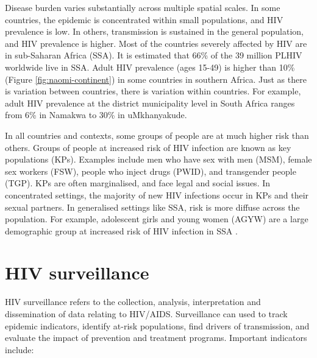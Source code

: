 \documentclass[a4paper, nobind]{templates/ociamthesis}
\begin{document}
Disease burden varies substantially across multiple spatial scales.
In some countries, the epidemic is concentrated within small populations, and HIV prevalence is low.
In others, transmission is sustained in the general population, and HIV prevalence is higher.
Most of the countries severely affected by HIV are in sub-Saharan Africa (SSA).
It is estimated that 66\% of the 39 million PLHIV worldwide live in SSA.
Adult HIV prevalence (ages 15-49) is higher than 10\% (Figure \ref{fig:naomi-continent}) in some countries in southern Africa.
Just as there is variation between countries, there is variation within countries.
For example, adult HIV prevalence at the district municipality level in South Africa ranges from 6\% in Namakwa to 30\% in uMkhanyakude.

In all countries and contexts, some groups of people are at much higher risk than others.
Groups of people at increased risk of HIV infection are known as key populations (KPs).
Examples include men who have sex with men (MSM), female sex workers (FSW), people who inject drugs (PWID), and transgender people (TGP).
KPs are often marginalised, and face legal and social issues.
In concentrated settings, the majority of new HIV infections occur in KPs and their sexual partners.
In generalised settings like SSA, risk is more diffuse across the population.
For example, adolescent girls and young women (AGYW) are a large demographic group at increased risk of HIV infection in SSA \autocite{risher2021age,monod2023growing}.

\hypertarget{hiv-surveillance}{%
\section{\texorpdfstring{HIV surveillance \label{sec:surveillance}}{HIV surveillance }}\label{hiv-surveillance}}

HIV surveillance refers to the collection, analysis, interpretation and dissemination of data relating to HIV/AIDS.
Surveillance can used to track epidemic indicators, identify at-risk populations, find drivers of transmission, and evaluate the impact of prevention and treatment programs.
Important indicators include:
\end{document}
